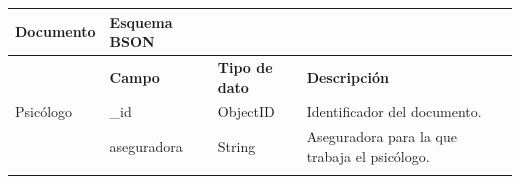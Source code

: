 \begin{table}[htpb]
\centering
\begin{tabularx}{\textwidth}{|l|X|X|X|X|}
\hline
\rowcolor[gray]{0.9}\textbf{Documento}          & \textbf{Esquema BSON                                                                                                                                          } &                                                                                                                            &                                                                                                                                                                                                                                                                             \\ \hline
                   & \textbf{Campo                                                                                                                                                 } & \textbf{Tipo de dato                                                                                                              } & \textbf{Descripción}                                                                                                                                                                                                                                                                 \\ \hline
Psicólogo         & \_id                                                                                                                                                   & ObjectID                                                                                                                   & Identificador del documento.                                                                                                                                                                                                                                                \\ \hline
\multirow{18}{*}{} & aseguradora                                                                                                                                            & String                                                                                                                     & Aseguradora para la que trabaja el psicólogo.                                                                                                                                                                                                                               \\ \cline{2-4} 

\end{tabularx}
\end{table}
